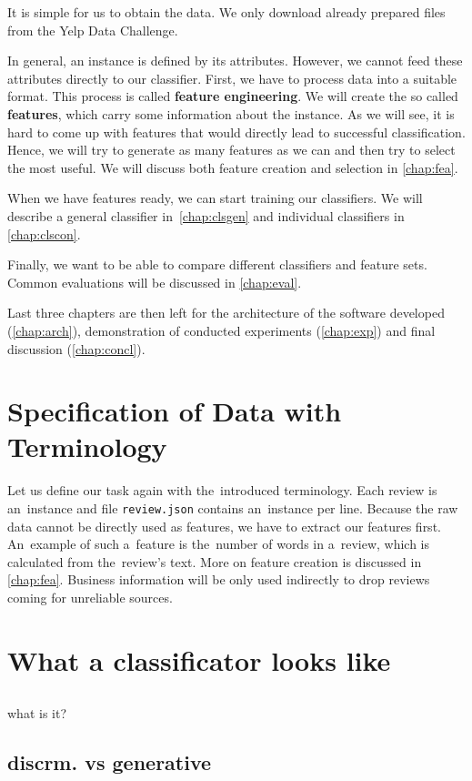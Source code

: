 It is simple for us to obtain the data. We only download already prepared files from the Yelp Data Challenge.

In general, an instance is defined by its attributes.
However, we cannot feed these attributes directly to our classifier.
First, we have to process data into a suitable format. This process is called {\bf feature engineering}.
We will create the so called {\bf features}, which carry some information about the instance.
As we will see, it is hard to come up with features that would directly lead to successful classification.
Hence, we will try to generate as many features as we can and then try to select the most useful.
We will discuss both feature creation and selection in \autoref{chap:fea}.

When we have features ready, we can start training our classifiers. We will describe a general classifier in~\ref{chap:clsgen} and
individual classifiers in \autoref{chap:clscon}.

Finally, we want to be able to compare different classifiers and feature sets. Common evaluations will be discussed in \ref{chap:eval}.

Last three chapters are then left for the architecture of the software developed (\autoref{chap:arch}), demonstration of conducted experiments (\autoref{chap:exp}) and final discussion (\autoref{chap:concl}).


\section{Specification of Data with Terminology}

Let us define our task again with the~introduced terminology.
Each review is an~instance and file \texttt{review.json} contains an~instance per line.
Because the raw data cannot be directly used as features, we have to extract our features first.
An~example of such a~feature is the~number of words in a~review, which is calculated from the~review's text.
More on feature creation is discussed in \autoref{chap:fea}.
Business information will be only used indirectly to drop reviews coming for unreliable sources.


\section{What a classificator looks like}

\subsection{}

what is it?

\subsection{discrm. vs generative}
